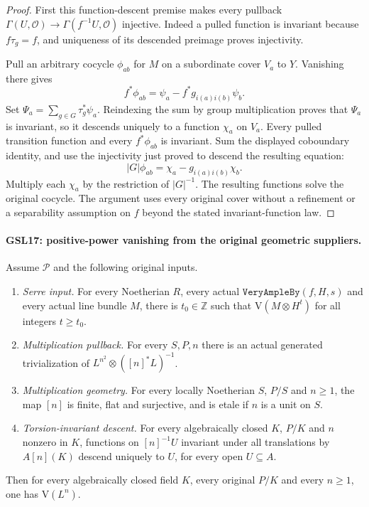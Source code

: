 \begin{proof}
First this function-descent premise makes every pullback
$\Gamma(U,\mathcal O)\to\Gamma(f^{-1}U,\mathcal O)$ injective.
Indeed a pulled function is invariant because $f\tau_g=f$,
and uniqueness of its descended preimage proves injectivity.

Pull an arbitrary cocycle $\phi_{ab}$ for $M$ on a subordinate
cover $V_a$ to $Y$.  Vanishing there gives
\[
 f^*\phi_{ab}=\psi_a-f^*g_{i(a)i(b)}\psi_b.
\]
Set $\Psi_a=\sum_{g\in G}\tau_g^*\psi_a$.  Reindexing the sum
by group multiplication proves that $\Psi_a$ is invariant,
so it descends uniquely to a function $\chi_a$ on $V_a$.
Every pulled transition function and every $f^*\phi_{ab}$ is
invariant.  Sum the displayed coboundary identity, and use the
injectivity just proved to descend the resulting equation:
\[
 |G|\phi_{ab}=\chi_a-g_{i(a)i(b)}\chi_b.
\]
Multiply each $\chi_a$ by the restriction of $|G|^{-1}$.
The resulting functions solve the original cocycle.  The argument
uses every original cover without a refinement or a separability
assumption on $f$ beyond the stated invariant-function law.
\end{proof}

\paragraph{GSL17: positive-power vanishing from the original geometric suppliers.}
\label{claim:GSL17}
Assume $\mathcal P$ and the following original inputs.

\begin{enumerate}
 \item \emph{Serre input.}  For every Noetherian $R$, every actual
 $\texttt{VeryAmpleBy}(f,H,s)$ and every actual line bundle $M$,
 there is $t_0\in\mathbb Z$ such that
 $\mathrm V(M\otimes H^t)$ for all integers $t\ge t_0$.
 \item \emph{Multiplication pullback.}  For every $S,P,n$ there
 is an actual generated trivialization of
 $L^{n^2}\otimes([n]^*L)^{-1}$.
 \item \emph{Multiplication geometry.}  For every locally Noetherian
 $S$, $P/S$ and $n\ge1$, the map $[n]$ is finite, flat and
 surjective, and is etale if $n$ is a unit on $S$.
 \item \emph{Torsion-invariant descent.}  For every algebraically
 closed $K$, $P/K$ and $n$ nonzero in $K$, functions on
 $[n]^{-1}U$ invariant under all translations by $A[n](K)$
 descend uniquely to $U$, for every open $U\subseteq A$.
\end{enumerate}
Then for every algebraically closed field $K$, every original
$P/K$ and every $n\ge1$, one has $\mathrm V(L^n)$.

